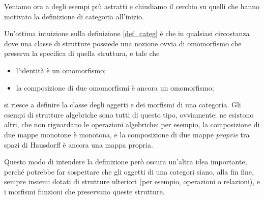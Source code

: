 Veniamo ora a degli esempi più astratti e chiudiamo il cerchio su quelli che hanno motivato la definizione di categoria all'inizio.

Un'ottima intuizione sulla definizione \ref{def_categ} è che in qualsiasi circostanza dove una classe di strutture possiede una nozione ovvia di omomorfismo che preserva la specifica di quella struttura, e tale che
\begin{itemize}
	\item l'identità è un omomorfismo;
	\item la composizione di due omomorfismi è ancora un omomorfismo;
\end{itemize}
si riesce a definire la classe degli oggetti e dei morfismi di una categoria. Gli esempi di strutture algebriche sono tutti di questo tipo, ovviamente; ne esistono altri, che non riguardano le operazioni algebriche: per esempio, la composizione di due mappe monotone è monotona, e la composizione di due mappe \emph{proprie} tra spazi di Hausdorff è ancora una mappa propria.

Questo modo di intendere la definizione però oscura un'altra idea importante, perché potrebbe far sospettare che gli oggetti di una categori siano, alla fin fine, sempre insiemi dotati di strutture ulteriori (per esempio, operazioni o relazioni), e i morfismi funzioni che preservano queste strutture.

